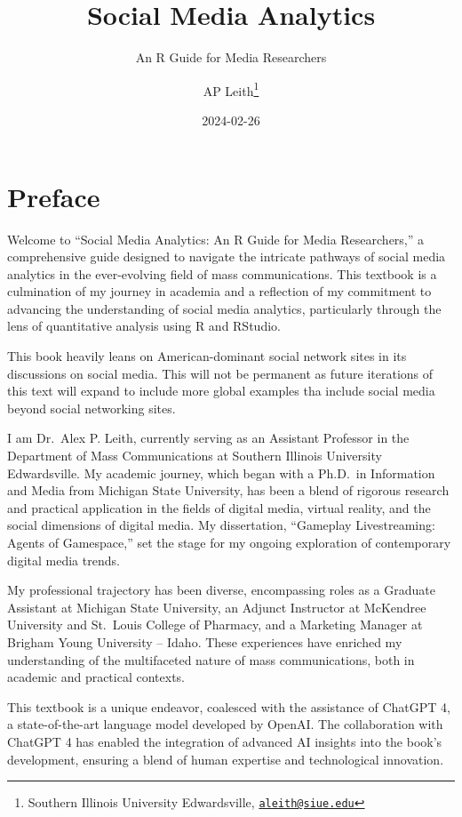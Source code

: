 \documentclass[
]{book}
\title{Social Media Analytics}
\subtitle{An R Guide for Media Researchers}
\author{AP Leith\footnote{Southern Illinois University Edwardsville, \href{mailto:aleith@siue.edu}{\nolinkurl{aleith@siue.edu}}}}
\date{2024-02-26}
\begin{document}
\maketitle

{
\setcounter{tocdepth}{1}
\tableofcontents
}
\hypertarget{preface}{%
\chapter*{Preface}\label{preface}}

Welcome to ``Social Media Analytics: An R Guide for Media Researchers,'' a comprehensive guide designed to navigate the intricate pathways of social media analytics in the ever-evolving field of mass communications. This textbook is a culmination of my journey in academia and a reflection of my commitment to advancing the understanding of social media analytics, particularly through the lens of quantitative analysis using R and RStudio.

This book heavily leans on American-dominant social network sites in its discussions on social media. This will not be permanent as future iterations of this text will expand to include more global examples tha include social media beyond social networking sites.

I am Dr.~Alex P. Leith, currently serving as an Assistant Professor in the Department of Mass Communications at Southern Illinois University Edwardsville. My academic journey, which began with a Ph.D.~in Information and Media from Michigan State University, has been a blend of rigorous research and practical application in the fields of digital media, virtual reality, and the social dimensions of digital media. My dissertation, ``Gameplay Livestreaming: Agents of Gamespace,'' set the stage for my ongoing exploration of contemporary digital media trends.

My professional trajectory has been diverse, encompassing roles as a Graduate Assistant at Michigan State University, an Adjunct Instructor at McKendree University and St.~Louis College of Pharmacy, and a Marketing Manager at Brigham Young University -- Idaho. These experiences have enriched my understanding of the multifaceted nature of mass communications, both in academic and practical contexts.

This textbook is a unique endeavor, coalesced with the assistance of ChatGPT 4, a state-of-the-art language model developed by OpenAI. The collaboration with ChatGPT 4 has enabled the integration of advanced AI insights into the book's development, ensuring a blend of human expertise and technological innovation.
\end{document}
